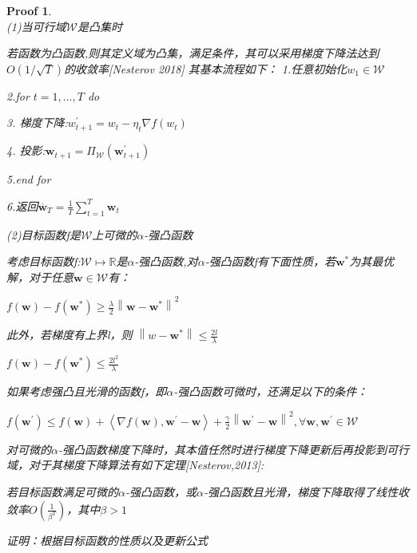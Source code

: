 \documentclass[a4paper,UTF8]{article}
\numberwithin{equation}{section}
\newtheorem*{myProof}{Proof}
\begin{document}
	\begin{myProof}~\\ 
		
		(1)当可行域$\mathcal{W}$是凸集时
		
		若函数为凸函数,则其定义域为凸集，满足条件，其可以采用梯度下降法达到$O(1 / \sqrt{T})$的收敛率[Nesterov 2018]
		其基本流程如下：
		1.任意初始化$w_{1} \in \mathcal{W}$
		
		2.for $t=1, \ldots, T$ do
		
		3.    梯度下降:$w_{t+1}^{\prime}=w_{t}-\eta_{t} \nabla f\left(w_{t}\right)$
		
		4.    投影:$\boldsymbol{w}_{t+1}=\Pi_{\mathcal{W}}\left(\boldsymbol{w}_{t+1}^{\prime}\right)$
		
		5.end for
		
		6.返回$\overline{\boldsymbol{w}}_{T}=\frac{1}{T} \sum_{t=1}^{T} \boldsymbol{w}_{t}$
		
		(2)目标函数f是$\mathcal{W}$上可微的$\alpha$-强凸函数
		
		考虑目标函数f:$\mathcal{W} \mapsto \mathbb{R}$是$\alpha$-强凸函数,对$\alpha$-强凸函数f有下面性质，若$\boldsymbol{w}^{*}$为其最优解，对于任意$\boldsymbol{w} \in \mathcal{W}$有：
		
		$f(\boldsymbol{w})-f\left(\boldsymbol{w}^{*}\right) \geqslant \frac{\lambda}{2}\left\|\boldsymbol{w}-\boldsymbol{w}^{*}\right\|^{2}$
		
		此外，若梯度有上界l，则
		$\left\|w-\boldsymbol{w}^{*}\right\| \leqslant \frac{2 l}{\lambda}$
		
		$f(\boldsymbol{w})-f\left(\boldsymbol{w}^{*}\right) \leqslant \frac{2 l^{2}}{\lambda}$
		
		如果考虑强凸且光滑的函数f，即$\alpha$-强凸函数可微时，还满足以下的条件：
		
		$f\left(\boldsymbol{w}^{\prime}\right) \leqslant f(\boldsymbol{w})+\left\langle\nabla f(\boldsymbol{w}), \boldsymbol{w}^{\prime}-\boldsymbol{w}\right\rangle+\frac{\gamma}{2}\left\|\boldsymbol{w}^{\prime}-\boldsymbol{w}\right\|^{2}, \forall \boldsymbol{w}, \boldsymbol{w}^{\prime} \in \mathcal{W}$
		
		对可微的$\alpha$-强凸函数梯度下降时，其本值任然时进行梯度下降更新后再投影到可行域，对于其梯度下降算法有如下定理[Nesterov,2013]:
		
		若目标函数满足可微的$\alpha$-强凸函数，或$\alpha$-强凸函数且光滑，梯度下降取得了线性收敛率$O\left(\frac{1}{\beta^{T}}\right)$，其中$\beta > 1$
		
		证明：根据目标函数的性质以及更新公式
		

\end{myProof}
\end{document}
